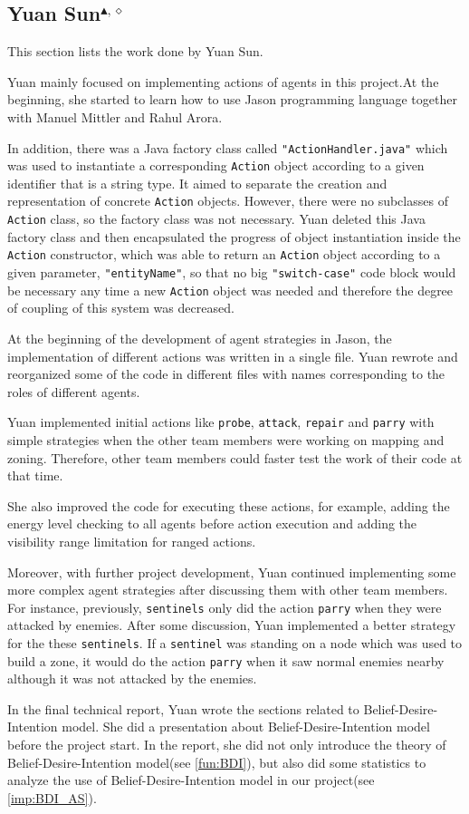 \subsection[Yuan Sun]{Yuan Sun$^{\blacktriangle,\diamond}$}
This section lists the work done by Yuan Sun.

Yuan mainly focused on implementing actions of agents in this project.At the beginning, she started to learn how to use Jason programming language together with Manuel Mittler and Rahul Arora.

In addition, there was a Java factory class called \texttt{"ActionHandler.java"} which was used to instantiate a corresponding \texttt{Action} object according to a given identifier that is a string type. It aimed to separate the creation and representation of concrete \texttt{Action} objects. However, there were no subclasses of \texttt{Action} class, so the factory class was not necessary. Yuan deleted this Java factory class and then encapsulated the progress of object instantiation inside the \texttt{Action} constructor, which was able to return an \texttt{Action} object according to a given parameter, \texttt{"entityName"}, so that no big \texttt{"switch-case"} code block would be necessary any time a new \texttt{Action} object was needed and therefore the degree of coupling of this system was decreased. 

At the beginning of the development of agent strategies in Jason, the implementation of different actions was written in a single file. 
Yuan rewrote and reorganized some of the code in different files with names corresponding to the roles of different agents. 

Yuan implemented initial actions like \texttt{probe}, \texttt{attack}, \texttt{repair} and \texttt{parry} with simple strategies when the other team members were working on mapping and zoning. 
Therefore, other team members could faster test the work of their code at that time. 

She also improved the code for executing these actions, for example, adding the energy level checking to all agents before action execution and adding the visibility range limitation for ranged actions. 

Moreover, with further project development, Yuan continued implementing some more complex agent strategies after discussing them with other team members. For instance, previously, \texttt{sentinels} only did the action \texttt{parry} when they were attacked by enemies. After some discussion, Yuan implemented a better strategy for the these \texttt{sentinels}. If a \texttt{sentinel} was standing on a node which was used to build a zone, it would do the action \texttt{parry} when it saw normal enemies nearby although it was not attacked by the enemies.

In the final technical report, Yuan wrote the sections related to Belief-Desire-Intention model. 
She did a presentation about Belief-Desire-Intention model before the project start. 
In the report, she did not only introduce the theory of Belief-Desire-Intention model(see \autoref{fun:BDI}), but also did some statistics to analyze the use of Belief-Desire-Intention model in our project(see \autoref{imp:BDI_AS}). 